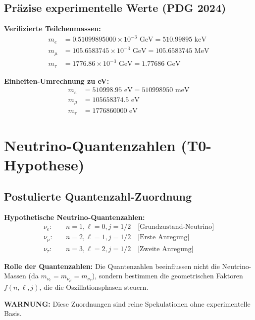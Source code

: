 	\subsection{Präzise experimentelle Werte (PDG 2024)}
	
	\begin{experimental}
		\textbf{Verifizierte Teilchenmassen:}
		\begin{align}
			m_e &= 0.51099895000 \times 10^{-3} \text{ GeV} = 510.99895 \text{ keV} \\
			m_\mu &= 105.6583745 \times 10^{-3} \text{ GeV} = 105.6583745 \text{ MeV} \\
			m_\tau &= 1776.86 \times 10^{-3} \text{ GeV} = 1.77686 \text{ GeV}
		\end{align}
		
		\textbf{Einheiten-Umrechnung zu eV:}
		\begin{align}
			m_e &= 510998.95 \text{ eV} = 510998950 \text{ meV} \\
			m_\mu &= 105658374.5 \text{ eV} \\
			m_\tau &= 1776860000 \text{ eV}
		\end{align}
	\end{experimental}
	
	\section{Neutrino-Quantenzahlen (T0-Hypothese)}
	
	\subsection{Postulierte Quantenzahl-Zuordnung}
	
	\begin{speculation}
		\textbf{Hypothetische Neutrino-Quantenzahlen:}
		\begin{align}
			\nu_e: &\quad n=1, \ell=0, j=1/2 \quad \text{[Grundzustand-Neutrino]} \\
			\nu_\mu: &\quad n=2, \ell=1, j=1/2 \quad \text{[Erste Anregung]} \\
			\nu_\tau: &\quad n=3, \ell=2, j=1/2 \quad \text{[Zweite Anregung]}
		\end{align}
		
		\textbf{Rolle der Quantenzahlen:}
		Die Quantenzahlen beeinflussen nicht die Neutrino-Massen (da \(m_{\nu_e} = m_{\nu_\mu} = m_{\nu_\tau}\)), sondern bestimmen die geometrischen Faktoren \(f(n, \ell, j)\), die die Oszillationsphasen steuern.
		
		\textbf{WARNUNG:} Diese Zuordnungen sind reine Spekulationen ohne experimentelle Basis.
	\end{speculation}
	
